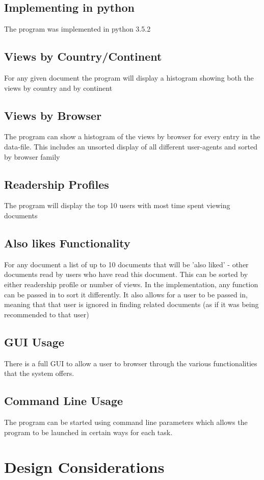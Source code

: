 \documentclass[11pt]{report}
\begin{document}
\section{Implementing in python}
The program was implemented in python 3.5.2
\section{Views by Country/Continent}
For any given document the program will display a histogram showing both the views by country and by continent
\section{Views by Browser}
The program can show a histogram of the views by browser for every entry in the data-file.  This includes an unsorted display of all different user-agents and sorted by browser family
\section{Readership Profiles}
The program will display the top 10 users with most time spent viewing documents
\section{Also likes Functionality}
For any document a list of up to 10 documents that will be 'also liked' - other documents read by  users who have read this document.  This can be sorted by either readership profile or number of views.  In the implementation, any function can be passed in to sort it differently.  It also allows for a user to be passed in, meaning that that user is ignored in finding related documents (as if it was being recommended to that user)
\section{GUI Usage}
There is a full GUI to allow a user to browser through the various functionalities that the system offers.
\section{Command Line Usage}
The program can be started using command line parameters which allows the program to be launched in certain ways for each task.

\chapter{Design Considerations}
\end{document}
